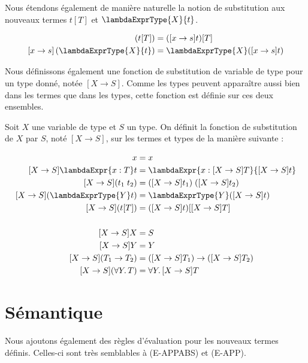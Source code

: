Nous étendons également de manière naturelle la notion de substitution aux
nouveaux termes $t[T]$ et $\lambdaExprType{X}{t}$.

\begin{align*}
  [x \rightarrow s] \, (t[T]) & = ([x \rightarrow s]t)[T] \\
  [x \rightarrow s] \, (\lambdaExprType{X}{t}) & = \lambdaExprType{X}([x \rightarrow s]t)
\end{align*}

Nous définissons également une fonction de substitution de variable de type pour
un type donné, notée $[X \rightarrow S]$. Comme les types peuvent apparaître
aussi bien dans les termes que dans les types, cette fonction est définie sur
ces deux ensembles.

\begin{definition}
  Soit $X$ une variable de type et $S$ un type. On définit la fonction de
  substitution de $X$ par $S$, noté $[X \rightarrow S]$, sur les termes et types
  de la manière suivante :

  \begin{align*}
    [X \rightarrow S]x & = x \\
    [X \rightarrow S]\lambdaExpr{x : T} t & = \lambdaExpr{x : [X \rightarrow S]T}{[X \rightarrow S]t} \\
    [X \rightarrow S](t_{1} \; t_{2}) & = ([X \rightarrow S]t_{1}) \; ([X \rightarrow S]t_{2}) \\
    [X \rightarrow S](\lambdaExprType{Y} t) & = \lambdaExprType{Y}([X \rightarrow S] t) \\
    [X \rightarrow S](t[T]) & = ([X \rightarrow S] t)[[X \rightarrow S] T] \\
    \\
    [X \rightarrow S]X & = S \\
    [X \rightarrow S]Y & = Y \\
    [X \rightarrow S](T_{1} \rightarrow T_{2}) & = ([X \rightarrow S]T_{1}) \rightarrow ([X \rightarrow S] T_{2}) \\
    [X \rightarrow S](\forall Y .\, T) & = \forall Y . \, [X \rightarrow S]T
  \end{align*}
\end{definition}
\section{Sémantique}

Nous ajoutons également des règles d'évaluation pour les nouveaux termes
définis. Celles-ci sont très semblables à (E-APPABS) et (E-APP).

